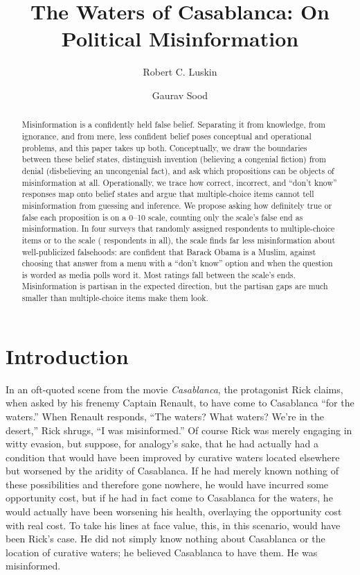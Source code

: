 \documentclass[11pt]{article}
\title{The Waters of Casablanca: On Political Misinformation}
\author{Robert C. Luskin \and Gaurav Sood}
\date{}
\begin{document}
\maketitle

\begin{abstract}
\noindent Misinformation is a confidently held false belief. Separating it from knowledge, from ignorance, and from mere, less confident belief poses conceptual and operational problems, and this paper takes up both. Conceptually, we draw the boundaries between these belief states, distinguish invention (believing a congenial fiction) from denial (disbelieving an uncongenial fact), and ask which propositions can be objects of misinformation at all. Operationally, we trace how correct, incorrect, and ``don't know'' responses map onto belief states and argue that multiple-choice items cannot tell misinformation from guessing and inference. We propose asking how definitely true or false each proposition is on a 0--10 scale, counting only the scale's false end as misinformation. In four surveys that randomly assigned respondents to multiple-choice items or to the scale (\nTotal{} respondents in all), the scale finds far less misinformation about well-publicized falsehoods: \muslimScale{} are confident that Barack Obama is a Muslim, against \muslimMc{} choosing that answer from a menu with a ``don't know'' option and \muslimMedia{} when the question is worded as media polls word it. Most ratings fall between the scale's ends. Misinformation is partisan in the expected direction, but the partisan gaps are much smaller than multiple-choice items make them look.
\end{abstract}

\section{Introduction}

In an oft-quoted scene from the movie \emph{Casablanca}, the protagonist Rick claims, when asked by his frenemy Captain Renault, to have come to Casablanca ``for the waters.'' When Renault responds, ``The waters? What waters? We're in the desert,'' Rick shrugs, ``I was misinformed.'' Of course Rick was merely engaging in witty evasion, but suppose, for analogy's sake, that he had actually had a condition that would have been improved by curative waters located elsewhere but worsened by the aridity of Casablanca. If he had merely known nothing of these possibilities and therefore gone nowhere, he would have incurred some opportunity cost, but if he had in fact come to Casablanca for the waters, he would actually have been worsening his health, overlaying the opportunity cost with real cost. To take his lines at face value, this, in this scenario, would have been Rick's case. He did not simply know nothing about Casablanca or the location of curative waters; he believed Casablanca to have them. He was misinformed.
\end{document}
